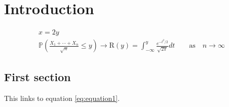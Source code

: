 \documentclass[portuguese]{ist-thesis}
\begin{document}
\cleardoublepage

\chapter{Introduction}

\begin{gather}
	x = 2y \label{eq:equation1}\\
	\mathbb{P}\left(\frac{X_1 + \cdots + X_n}{\sqrt{n}} \leq y\right) \rightarrow \mathrm{R}(y) = \int_{-\infty}^{y} \frac{e^{-t^2/2}}{\sqrt{2\pi}}dt \qquad \mathrm{as} \quad n \rightarrow \infty
\end{gather}

\section{First section}

This links to equation \ref{eq:equation1}.

\lipsum
\end{document}
